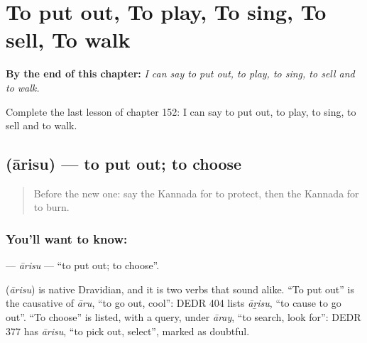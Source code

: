
\chapter{To put out, To play, To sing, To sell, To walk}
\label{ch:ka-to-put-out-to-play-to-sing-to-sell-to-walk}

\begin{chapteropening}
\textbf{By the end of this chapter:} \emph{I can say to put out, to play, to sing, to sell and to walk.}

Complete the last lesson of chapter 152: I can say to put out, to play, to sing, to sell and to walk.
\end{chapteropening}

\section[\texorpdfstring{\kn{ಆರಿಸು} (ārisu)}{ಆರಿಸು (ārisu)}]{ (ārisu) — to put out; to choose}

\label{lesson:KA-C152-arisu}



\begin{quote}
Before the new one: say the Kannada for to protect, then the Kannada for to burn.
\end{quote}

\subsection*{You'll want to know: }
\textbf{} — \emph{ārisu} — \textquotedblleft{}to put out; to choose\textquotedblright{}.

\begin{cousinweb}
\textbf{} (\emph{ārisu}) is native Dravidian, and it is two verbs that sound alike. \textquotedblleft{}To put out\textquotedblright{} is the causative of \emph{āru}, \textquotedblleft{}to go out, cool\textquotedblright{}: DEDR 404 lists \emph{āṟisu}, \textquotedblleft{}to cause to go out\textquotedblright{}. \textquotedblleft{}To choose\textquotedblright{} is listed, with a query, under \emph{āray}, \textquotedblleft{}to search, look for\textquotedblright{}: DEDR 377 has \emph{ārisu}, \textquotedblleft{}to pick out, select\textquotedblright{}, marked as doubtful.
\end{cousinweb}


